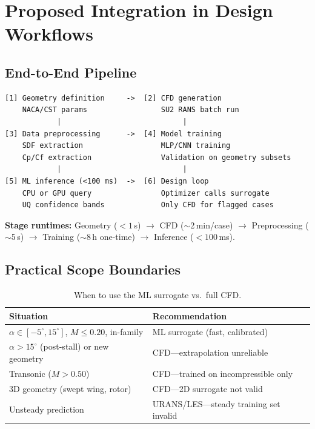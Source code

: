 \documentclass[11pt,a4paper]{article}
\begin{document}
\section{Proposed Integration in Design Workflows}
\label{sec:workflow}

\subsection{End-to-End Pipeline}

\begin{verbatim}
[1] Geometry definition     ->  [2] CFD generation
    NACA/CST params                 SU2 RANS batch run
            |                            |
[3] Data preprocessing      ->  [4] Model training
    SDF extraction                  MLP/CNN training
    Cp/Cf extraction                Validation on geometry subsets
            |                            |
[5] ML inference (<100 ms)  ->  [6] Design loop
    CPU or GPU query                Optimizer calls surrogate
    UQ confidence bands             Only CFD for flagged cases
\end{verbatim}

\noindent\textbf{Stage runtimes:}
Geometry ($<1$\,s) $\to$ CFD ($\sim$2\,min/case) $\to$ Preprocessing
($\sim$5\,s) $\to$ Training ($\sim$8\,h one-time) $\to$ Inference
($<100$\,ms).

\subsection{Practical Scope Boundaries}

\begin{table}[!ht]
\centering
\caption{When to use the ML surrogate vs.\ full CFD.}
\begin{tabular}{lp{7cm}}
\toprule
\textbf{Situation} & \textbf{Recommendation} \\
\midrule
$\alpha\in[-5^\circ,15^\circ]$, $M\le0.20$, in-family &
  ML surrogate (fast, calibrated) \\
$\alpha > 15^\circ$ (post-stall) or new geometry &
  CFD---extrapolation unreliable \\
Transonic ($M > 0.50$) &
  CFD---trained on incompressible only \\
3D geometry (swept wing, rotor) &
  CFD---2D surrogate not valid \\
Unsteady prediction &
  URANS/LES---steady training set invalid \\
\bottomrule
\end{tabular}
\end{table}
\end{document}
